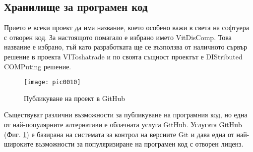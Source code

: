 \subsection{Хранилище за програмен код}

Прието е всеки проект да има название, което особено важи в света на софтуера с отворен код. За настоящото помагало е избрано името VitDisComp. Това название е избрано, тъй като разработката ще се възползва от наличното сървър решение в проекта VIToshatrade \cite{vtrade} и по своята същност проектът е DIStributed COMPuting решение. 

\begin{figure}[h]
  \centering
  \texttt{[image: pic0010]}
  \caption{Публикуване на проект в GitHub}
\label{fig:pic0010}
\end{figure}

Съществуват различни възможности за публикуване на програмния код, но една от най-популярните алтернативи е облачната услуга GitHub. Услугата GitHub (Фиг. \ref{fig:pic0010}) е базирана на системата за контрол на версиите Git и дава една от най-широките възможности за популяризиране на програмен код с отворен лиценз.